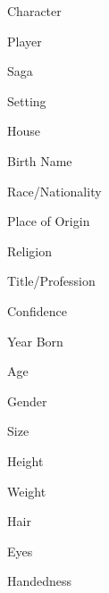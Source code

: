 \documentclass[a4paper]{article}
\begin{document}
\begin{multicols}{2}
\begin{minipage}{0.9\linewidth}
	\begin{small}
		Character\hrulefill
		
		Player\hrulefill
		
		Saga\hrulefill
		
		Setting\hrulefill
		
		House\hrulefill
				
		Birth Name\hrulefill
		
		Race/Nationality\hrulefill
		
		Place of Origin\hrulefill
		
		Religion\hrulefill
		
		Title/Profession\hrulefill
	\end{small}
\end{minipage}
\begin{minipage}{0.4\linewidth}
\begin{small}
	Confidence\hrulefill
	
	Year Born\hrulefill
	
	Age\hrulefill
	
	Gender\hrulefill
	
	Size\hrulefill
	
	Height\hrulefill
	
	Weight\hrulefill
	
	Hair\hrulefill
	
	Eyes\hrulefill
	
	Handedness\hrulefill
\end{small}
\end{minipage}
\begin{minipage}{0.3\linewidth}
	
\end{minipage}
\end{multicols}
\end{document}

